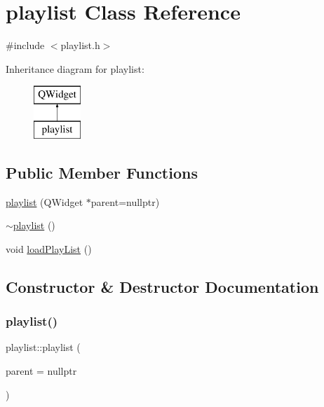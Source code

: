 \hypertarget{classplaylist}{}\section{playlist Class Reference}
\label{classplaylist}


{\ttfamily \#include $<$playlist.\+h$>$}

Inheritance diagram for playlist\+:\begin{figure}[H]
\begin{center}
\leavevmode
\includegraphics[height=2.000000cm]{classplaylist}
\end{center}
\end{figure}
\subsection*{Public Member Functions}
\begin{DoxyCompactItemize}
\item 
\mbox{\hyperlink{classplaylist_a139ec49ee35f0b6055eeef9ce41a682d}{playlist}} (Q\+Widget $\ast$parent=nullptr)
\item 
\mbox{\hyperlink{classplaylist_af36b9d7df2267ddfac92496ced1c235c}{$\sim$playlist}} ()
\item 
void \mbox{\hyperlink{classplaylist_a8dd729dc3ef1195d6667c00624f3057d}{load\+Play\+List}} ()
\end{DoxyCompactItemize}


\subsection{Constructor \& Destructor Documentation}
\mbox{\label{classplaylist_a139ec49ee35f0b6055eeef9ce41a682d}} 
\subsubsection{\texorpdfstring{playlist()}{playlist()}}
{\footnotesize\ttfamily playlist\+::playlist (\begin{DoxyParamCaption}\item[{Q\+Widget $\ast$}]{parent = {\ttfamily nullptr} }\end{DoxyParamCaption})\hspace{0.3cm}{\ttfamily [explicit]}}

